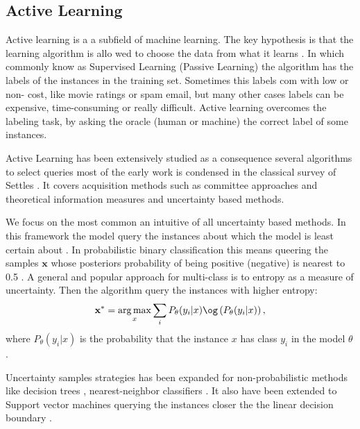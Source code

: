 \documentclass[12 pt]{IEEEtran}
\DeclareMathOperator*{\argmax}{arg\,max}
\begin{document}
\subsection{Active Learning}

Active learning  is a a subfield of machine learning. The key hypothesis is that the learning algorithm is allo wed to choose the data from what it learns \cite{settles2009active}. In which commonly know as Supervised Learning (Passive Learning) the algorithm has the labels of the instances in the training set. Sometimes this labels com with low or non- cost, like movie ratings or spam email, but many other  cases labels can be expensive, time-consuming or really difficult. Active learning  overcomes the labeling task, by asking the oracle (human or machine) the correct label of some instances.

Active Learning has been extensively studied as a consequence several algorithms to select queries most of the early work is condensed  in the classical survey of Settles \cite{settles2009active}.  It covers acquisition methods such as  committee approaches \cite{seung1992query,mccallumzy1998employing} and theoretical information measures  \cite{mackay1992information} and uncertainty based methods\cite{tsang2005core,li2013adaptive,tong2001support}.

We focus on the most common an intuitive of all uncertainty based methods. In this framework the model query the instances about which the model is least certain about \cite{lewis1994sequential}. In probabilistic binary classification this means queering the samples $\mathbf{x}$ whose  posteriors probability of being positive (negative) is nearest to  0.5 \cite{lewis1994sequential,lewis1994heterogeneous}. A general and popular  approach for multi-class is to entropy \cite{shannon1948mathematical} as a measure of uncertainty. Then the algorithm query the instances with higher entropy:
\begin{equation}
    \mathbf{x}^{*} =  \argmax _{x} \sum_{i} P_{\theta}(y_{i}|x)\og\left(P_{\theta}(y_{i}|x)\right),
\end{equation}
where $P_{\theta}(y_{i}|x)$ is the probability that the instance $x$ has class $y_i$ in the model $\theta$.

Uncertainty samples strategies has been expanded for non-probabilistic methods like decision trees \cite{lewis1994heterogeneous}, nearest-neighbor classifiers \cite{fujii1998selective,lindenbaum2004selective}. It also have been extended to Support vector machines querying the instances closer the the linear decision boundary \cite{tong2001support} .
\end{document}
